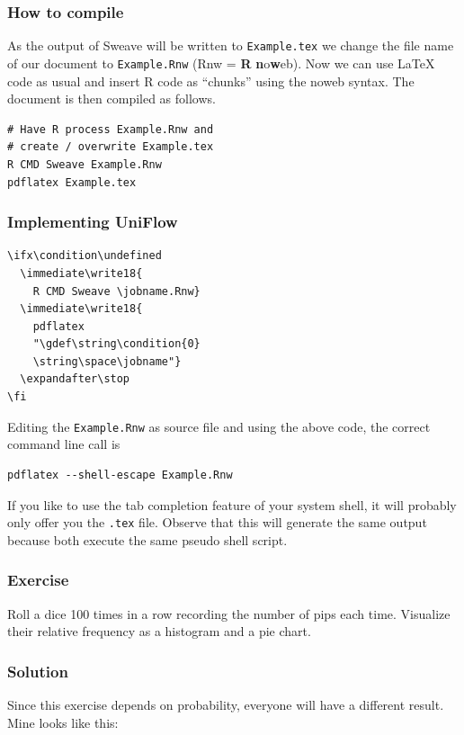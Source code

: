 \documentclass{maps}
\begin{document}
\subsubsection{How to compile}
As the output of Sweave will be written to \texttt{Example.tex} we change the file name of our document to \texttt{Example.Rnw} (Rnw = \textbf{R} \textbf{n}o\textbf{w}eb). Now we can use \LaTeX{} code as usual and insert R code as \enquote{chunks} using the noweb syntax. The document is then compiled as follows.

\begin{lstlisting}[style=arn:lst:bash]
# Have R process Example.Rnw and
# create / overwrite Example.tex
R CMD Sweave Example.Rnw
pdflatex Example.tex
\end{lstlisting}

\subsubsection{Implementing UniFlow}\strut

\begin{lstlisting}[language={[LaTeX]TeX}, style=arn:lst]
% Beginning of Example.Rnw
\ifx\condition\undefined
  \immediate\write18{
    R CMD Sweave \jobname.Rnw}
  \immediate\write18{
    pdflatex
    "\gdef\string\condition{0}
    \string\space\jobname"}
  \expandafter\stop
\fi
\end{lstlisting}

Editing the \texttt{Example.Rnw} as source file and using the above code, the correct command line call is
\begin{verbatim}
pdflatex --shell-escape Example.Rnw
\end{verbatim}
If you like to use the tab completion feature of your system shell,
it will probably only offer you the \texttt{.tex} file.
Observe that this will generate the same output because both execute the same pseudo shell script.

\subsubsection{Exercise}
Roll a dice 100 times in a row recording the number of pips each time. Visualize their relative frequency as a histogram and a pie chart.

\subsubsection{Solution}
Since this exercise depends on probability, everyone will have a different result. Mine looks like this:
\end{document}
